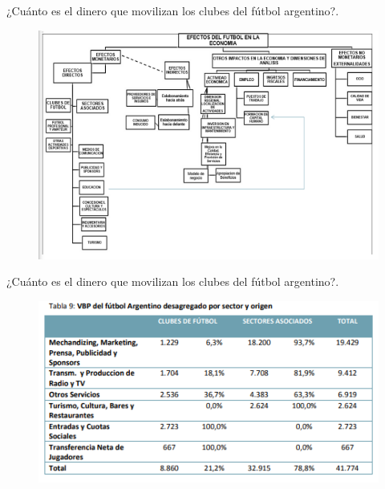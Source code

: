 \documentclass{beamer}
\begin{document}
\begin{frame}{¿Cuánto es el dinero que movilizan los clubes del fútbol argentino?.}
    \begin{figure} [H]   \includegraphics[scale=0.7]{Slides Principios de Economia/Figures/PBIFutbol.png}
\label{fig:25.2}
\end{figure}
\end{frame}

\begin{frame}{¿Cuánto es el dinero que movilizan los clubes del fútbol argentino?.}
    \begin{figure} [H]   \includegraphics[scale=0.75]{Slides Principios de Economia/Figures/PBIFutbolII.png}
\label{fig:25.2}
\end{figure}
\end{frame}
\end{document}
